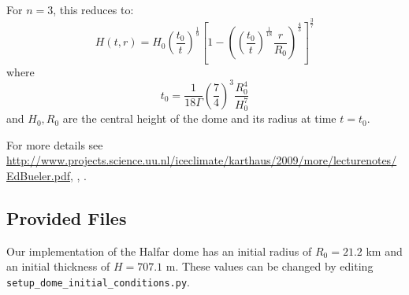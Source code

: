 For $n=3$, this reduces to:
\begin{equation}
    H(t,r) = H_0 \left(\frac{t_0}{t}\right)^\frac{1}{9}  \left[ 1 - \left(  \left( \frac{t_0}{t} \right) ^ \frac{1}{18} \frac{r}{R_0} \right)^\frac{4}{3} \right] ^ \frac{3}{7}
\end{equation}
where
\begin{equation}
    t_0 = \frac{1}{18\Gamma} \left( \frac{7}{4} \right)^3 \frac{R_0^4}{H_0^7}
\end{equation}
and $H_0, R_0$ are the central height of the dome and its radius at time $t=t_0$.

For more details see \url{http://www.projects.science.uu.nl/iceclimate/karthaus/2009/more/lecturenotes/EdBueler.pdf},  \citet{Bueler2005}, \citet{Halfar1983}.



\subsection{Provided Files}
\label{subsec:halfar_files}
Our implementation of the Halfar dome has an initial radius of $R_0=21.2$ km and an initial thickness of $H=707.1$ m.
These values can be changed by editing \texttt{setup\_dome\_initial\_conditions.py}.

